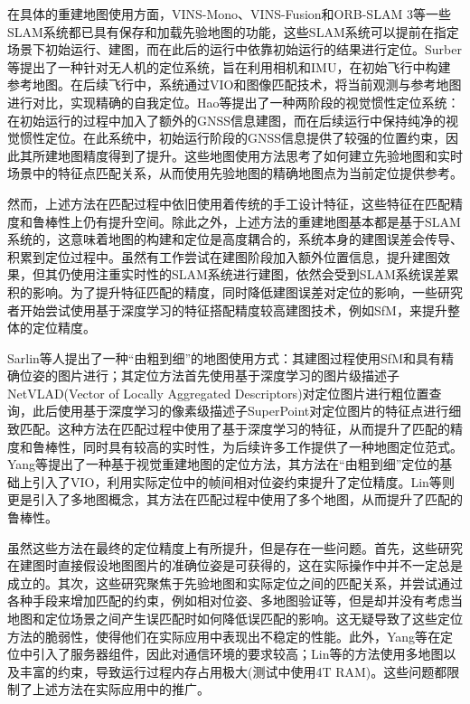 在具体的重建地图使用方面，VINS-Mono、VINS-Fusion和ORB-SLAM 3等一些SLAM系统都已具有保存和加载先验地图的功能，这些SLAM系统可以提前在指定场景下初始运行、建图，而在此后的运行中依靠初始运行的结果进行定位。Surber等\cite{surber2017robust}提出了一种针对无人机的定位系统，旨在利用相机和IMU，在初始飞行中构建参考地图。在后续飞行中，系统通过VIO和图像匹配技术，将当前观测与参考地图进行对比，实现精确的自我定位。Hao等\cite{hao2023global}提出了一种两阶段的视觉惯性定位系统：在初始运行的过程中加入了额外的GNSS信息建图，而在后续运行中保持纯净的视觉惯性定位。在此系统中，初始运行阶段的GNSS信息提供了较强的位置约束，因此其所建地图精度得到了提升。这些地图使用方法思考了如何建立先验地图和实时场景中的特征点匹配关系，从而使用先验地图的精确地图点为当前定位提供参考。

然而，上述方法在匹配过程中依旧使用着传统的手工设计特征，这些特征在匹配精度和鲁棒性上仍有提升空间。除此之外，上述方法的重建地图基本都是基于SLAM系统的，这意味着地图的构建和定位是高度耦合的，系统本身的建图误差会传导、积累到定位过程中。虽然有工作\cite{hao2023global}尝试在建图阶段加入额外位置信息，提升建图效果，但其仍使用注重实时性的SLAM系统进行建图，依然会受到SLAM系统误差累积的影响。为了提升特征匹配的精度，同时降低建图误差对定位的影响，一些研究者开始尝试使用基于深度学习的特征搭配精度较高建图技术，例如SfM，来提升整体的定位精度。

Sarlin等人\cite{sarlin2019coarse}提出了一种“由粗到细”的地图使用方式：其建图过程使用SfM和具有精确位姿的图片进行；其定位方法首先使用基于深度学习的图片级描述子NetVLAD(Vector of Locally Aggregated Descriptors)\cite{arandjelovic2016netvlad}对定位图片进行粗位置查询，此后使用基于深度学习的像素级描述子SuperPoint\cite{detone2018superpoint}对定位图片的特征点进行细致匹配。这种方法在匹配过程中使用了基于深度学习的特征，从而提升了匹配的精度和鲁棒性，同时具有较高的实时性，为后续许多工作提供了一种地图定位范式。Yang等\cite{yang2022real}提出了一种基于视觉重建地图的定位方法，其方法在“由粗到细”定位的基础上引入了VIO，利用实际定位中的帧间相对位姿约束提升了定位精度。Lin等\cite{lin2023visual}则更是引入了多地图概念，其方法在匹配过程中使用了多个地图，从而提升了匹配的鲁棒性。

虽然这些方法在最终的定位精度上有所提升，但是存在一些问题。首先，这些研究在建图时直接假设地图图片的准确位姿是可获得的，这在实际操作中并不一定总是成立的。其次，这些研究聚焦于先验地图和实际定位之间的匹配关系，并尝试通过各种手段来增加匹配的约束，例如相对位姿、多地图验证等，但是却并没有考虑当地图和定位场景之间产生误匹配时如何降低误匹配的影响。这无疑导致了这些定位方法的脆弱性，使得他们在实际应用中表现出不稳定的性能。此外，Yang等\cite{yang2022real}在定位中引入了服务器组件，因此对通信环境的要求较高；Lin等\cite{lin2023visual}的方法使用多地图以及丰富的约束，导致运行过程内存占用极大(测试中使用4T RAM)。这些问题都限制了上述方法在实际应用中的推广。

